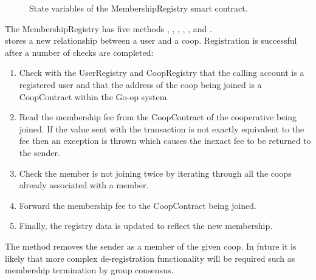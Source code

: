 \begin{figure}
\centering
{}
\decoRule
\caption[MembershipRegistry State Variables]{State variables of the MembershipRegistry smart contract.}
\label{fig:MemRegVars}
\end{figure}

The MembershipRegistry has five methods , , , , ,  and . \\

 stores a new relationship between a user and a coop. Registration is successful after a number of checks are completed:
\begin{enumerate}
\item Check with the UserRegistry and CoopRegistry that the calling account is a registered user and that the address of the coop being joined is a CoopContract within the Go-op system.

\item Read the membership fee from the CoopContract of the cooperative being joined. If the value sent with the transaction is not exactly equivalent to the fee then an exception is thrown which causes the inexact fee to be returned to the sender. 

\item Check the member is not joining twice by iterating through all the coops already associated with a member.

\item Forward the membership fee to the CoopContract being joined.

\item Finally, the registry data is updated to reflect the new membership.
\end{enumerate}

The  method removes the sender as a member of the given coop. In future it is likely that more complex de-registration functionality will be required such as membership termination by group consensus.\\


